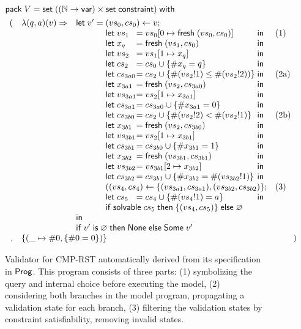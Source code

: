 \begin{figure}
\begin{align*}
&\existT{V}{\Set((\Nat\to\Var)\times\Set\constraint)}\\
  &\begin{array}{rll}
     (&\lam{(q,a)(v)}{&\llet v'=\begin{array}[t]{@{}l@{}l@{}ll}
       \multicolumn{3}{@{}l}{(vs_0,cs_0)\gets v;}\\
       \letin{vs_1&}{\update{vs_0}{0}{\Fresh (vs_0,cs_0)}&}&\text{(1)}\\
       \letin{x_q&}{\Fresh (vs_1,cs_0)&}\\
       \letin{vs_2&}{\update{vs_1}{1}{x_q}&}\\
       \letin{cs_2&}{cs_0\cup\{\#x_q= q\}&}\\
       \letin{cs_{3a0}&}{cs_2\cup\{\#(vs_2!1)\le\#(vs_2!2))\}&}&\text{(2a)}\\
       \letin{x_{3a1}&}{\Fresh (vs_2,cs_{3a0})&}\\
       \letin{vs_{3a1}&}{\update{vs_2}{1}{x_{3a1}}&}\\
       \letin{cs_{3a1}&}{cs_{3a0}\cup\{\#x_{3a1}=0\}&}\\
       \letin{cs_{3b0}&}{cs_2\cup\{\#(vs_2!2)<\#(vs_2!1)\}&}&\text{(2b)}\\
       \letin{x_{3b1}&}{\Fresh (vs_2,cs_{3b0})&}\\
       \letin{vs_{3b1}&}{\update{vs_2}{1}{x_{3b1}}&}\\
       \letin{cs_{3b1}&}{cs_{3b0}\cup\{\#x_{3b1}=1\}&}\\
       \letin{x_{3b2}&}{\Fresh (vs_{3b1},cs_{3b1})&}\\
       \letin{vs_{3b2}&}{\update{vs_{3b1}}{2}{x_{3b2}}&}\\
       \letin{cs_{3b2}&}{cs_{3b1}\cup\{\#x_{3b2}=\#(vs_{3b2}!1)\}&}\\
       \multicolumn{3}{@{}l}{((vs_4,cs_4)\gets\{(vs_{3a1},cs_{3a1}),(vs_{3b2},cs_{3b2})\};}&\text{(3)}\\
       \letin{cs_5&}{cs_4\cup\{\#(vs_4!1)= a\}&}\\
       \multicolumn{3}{@{}l}{\If\solvable cs_5\Then\{(vs_4,cs_5)\}\Else\varnothing}\\
       \end{array}\\
       &&\iin\\
       &&\If v'\Is\varnothing\Then\None\Else\Some v'
     }\\
     ,&\multicolumn{2}{l}{\{(\_\mapsto\#0,\{\#0=0\})\}})
   \end{array}
\end{align*}
\caption[Validator for protocol CMP-RST]{Validator for CMP-RST automatically
  derived from its specification in $\mathsf{Prog}$.  This program consists of three
  parts: (1) symbolizing the query and internal choice before executing the
  model, (2) considering both branches in the model program, propagating a
  validation state for each branch, (3) filtering the validation states by
  constraint satisfiability, removing invalid states.}
\label{fig:derived-validator}
\end{figure}

